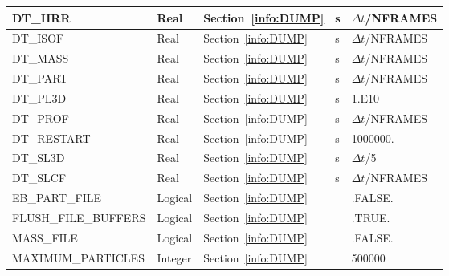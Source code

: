 \documentclass[11pt]{book}
\begin{document}
\begin{longtable}{@{\extracolsep{\fill}}|l|l|l|l|l|}
{\ct DT\_HRR}                       & Real         & Section~\ref{info:DUMP}                &  s        & $\Delta t${\ct /NFRAMES}       \\ \hline
{\ct DT\_ISOF}                      & Real         & Section~\ref{info:DUMP}                &  s        & $\Delta t${\ct /NFRAMES}       \\ \hline
{\ct DT\_MASS}                      & Real         & Section~\ref{info:DUMP}                &  s        & $\Delta t${\ct /NFRAMES}       \\ \hline
{\ct DT\_PART}                      & Real         & Section~\ref{info:DUMP}                &  s        & $\Delta t${\ct /NFRAMES}       \\ \hline
{\ct DT\_PL3D}                      & Real         & Section~\ref{info:DUMP}                &  s        & 1.E10             \\ \hline
{\ct DT\_PROF}                      & Real         & Section~\ref{info:DUMP}                &  s        & $\Delta t${\ct /NFRAMES}       \\ \hline
{\ct DT\_RESTART}                   & Real         & Section~\ref{info:DUMP}                &  s        & 1000000.                       \\ \hline
{\ct DT\_SL3D}                      & Real         & Section~\ref{info:DUMP}                &  s        & $\Delta t${\ct /5}             \\ \hline
{\ct DT\_SLCF}                      & Real         & Section~\ref{info:DUMP}                &  s        & $\Delta t${\ct /NFRAMES}       \\ \hline
{\ct EB\_PART\_FILE}                & Logical      & Section~\ref{info:DUMP}                &           & {\ct .FALSE.}                  \\ \hline
{\ct FLUSH\_FILE\_BUFFERS}          & Logical      & Section~\ref{info:DUMP}                &           & {\ct .TRUE.}                   \\ \hline
{\ct MASS\_FILE}                    & Logical      & Section~\ref{info:DUMP}                &           & {\ct .FALSE.}                  \\ \hline
{\ct MAXIMUM\_PARTICLES}            & Integer      & Section~\ref{info:DUMP}                &           & 500000                         \\ \hline

\end{longtable}
\end{document}
